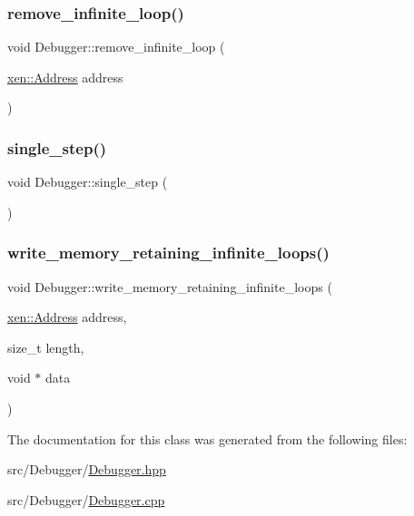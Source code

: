 \mbox{\label{classxd_1_1dbg_1_1_debugger_abfc9f74ef6e1e147ec853895d0e38f4a}} 
\subsubsection{\texorpdfstring{remove\+\_\+infinite\+\_\+loop()}{remove\_infinite\_loop()}}
{\footnotesize\ttfamily void Debugger\+::remove\+\_\+infinite\+\_\+loop (\begin{DoxyParamCaption}\item[{\mbox{\hyperlink{namespacexd_1_1xen_a94a8d6c9448e8330c771c100dba152c3}{xen\+::\+Address}}}]{address }\end{DoxyParamCaption})}

\mbox{\label{classxd_1_1dbg_1_1_debugger_ae22024cb4bd5d00f61a46d166356990f}} 
\subsubsection{\texorpdfstring{single\+\_\+step()}{single\_step()}}
{\footnotesize\ttfamily void Debugger\+::single\+\_\+step (\begin{DoxyParamCaption}{ }\end{DoxyParamCaption})}

\mbox{\label{classxd_1_1dbg_1_1_debugger_a6347de6428c0c1489f03a14c89b6fc74}} 
\subsubsection{\texorpdfstring{write\+\_\+memory\+\_\+retaining\+\_\+infinite\+\_\+loops()}{write\_memory\_retaining\_infinite\_loops()}}
{\footnotesize\ttfamily void Debugger\+::write\+\_\+memory\+\_\+retaining\+\_\+infinite\+\_\+loops (\begin{DoxyParamCaption}\item[{\mbox{\hyperlink{namespacexd_1_1xen_a94a8d6c9448e8330c771c100dba152c3}{xen\+::\+Address}}}]{address,  }\item[{size\+\_\+t}]{length,  }\item[{void $\ast$}]{data }\end{DoxyParamCaption})}



The documentation for this class was generated from the following files\+:\begin{DoxyCompactItemize}
\item 
src/\+Debugger/\mbox{\hyperlink{_debugger_8hpp}{Debugger.\+hpp}}\item 
src/\+Debugger/\mbox{\hyperlink{_debugger_8cpp}{Debugger.\+cpp}}\end{DoxyCompactItemize}
